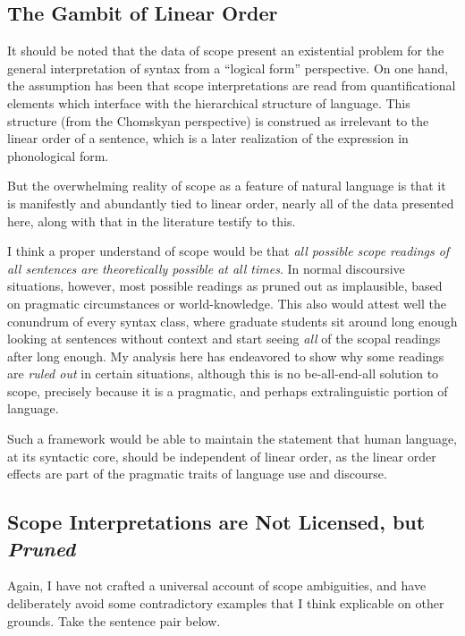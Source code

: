 \documentclass{article}
\begin{document}
\subsection{The Gambit of Linear Order}

It should be noted that the data of scope present an existential problem for the general interpretation of syntax from a ``logical form'' perspective. On one hand, the assumption has been that scope interpretations are read from quantificational elements which interface with the hierarchical structure of language. This structure (from the Chomskyan perspective) is construed as irrelevant to the linear order of a sentence, which is a later realization of the expression in phonological form.

But the overwhelming reality of scope as a feature of natural language is that it is manifestly and abundantly tied to linear order, nearly all of the data presented here, along with that in the literature testify to this.

I think a proper understand of scope would be that \emph{all possible scope readings of all sentences are theoretically possible at all times}. In normal discoursive situations, however, most possible readings as pruned out as implausible, based on pragmatic circumstances or world-knowledge. This also would attest well the conundrum of every syntax class, where graduate students sit around long enough looking at sentences without context and start seeing \emph{all} of the scopal readings after long enough. My analysis here has endeavored to show why some readings are \emph{ruled out} in certain situations, although this is no be-all-end-all solution to scope, precisely because it is a pragmatic, and perhaps extralinguistic portion of language.

Such a framework would be able to maintain the statement that human language, at its syntactic core, should be independent of linear order, as the linear order effects are part of the pragmatic traits of language use and discourse.

\subsection{Scope Interpretations are Not Licensed, but \emph{Pruned}}

Again, I have not crafted a universal account of scope ambiguities, and have deliberately avoid some contradictory examples that I think explicable on other grounds. Take the sentence pair below.
\end{document}
